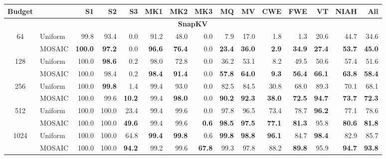 \begin{table}[tp]
  \centering
  \scriptsize
  \setlength{\tabcolsep}{4pt}
  \renewcommand{\arraystretch}{0.92}
  \begin{tabular}{@{} c l rrrrrrrrrrrrr @{}}
    \toprule
    \textbf{Budget} & & \textbf{S1} & \textbf{S2} & \textbf{S3} & \textbf{MK1} & \textbf{MK2} & \textbf{MK3} & \textbf{MQ} & \textbf{MV} & \textbf{CWE} & \textbf{FWE} & \textbf{VT} & \textbf{NIAH} & \textbf{All} \\
    \midrule
    \multicolumn{15}{c}{\textbf{SnapKV}} \\
    \midrule
    \multirow{2}{*}{64} & Uniform & 99.8 & 93.4 & 0.0 & 91.2 & 48.0 & 0.0 & 7.9 & 17.0 & 1.8 & 1.3 & 20.6 & 44.7 & 34.6 \\
     & MOSAIC & \textbf{100.0} & \textbf{97.2} & 0.0 & \textbf{96.6} & \textbf{76.4} & 0.0 & \textbf{23.4} & \textbf{36.0} & \textbf{2.9} & \textbf{34.9} & \textbf{27.4} & \textbf{53.7} & \textbf{45.0} \\
    \cmidrule(l){1-15}
    \multirow{2}{*}{128} & Uniform & 100.0 & \textbf{98.6} & 0.2 & 98.0 & 72.8 & 0.0 & 36.2 & 53.1 & 8.2 & 49.5 & 50.6 & 57.4 & 51.6 \\
     & MOSAIC & 100.0 & 98.4 & 0.2 & \textbf{98.4} & \textbf{91.4} & 0.0 & \textbf{57.8} & \textbf{64.0} & \textbf{9.3} & \textbf{56.4} & \textbf{66.1} & \textbf{63.8} & \textbf{58.4} \\
    \cmidrule(l){1-15}
    \multirow{2}{*}{256} & Uniform & 100.0 & \textbf{99.8} & 1.4 & 99.4 & 93.0 & 0.0 & 82.5 & 84.5 & 30.8 & 68.0 & 89.3 & 70.1 & 68.1 \\
     & MOSAIC & 100.0 & 99.6 & \textbf{10.2} & 99.4 & \textbf{98.0} & 0.0 & \textbf{90.2} & \textbf{92.3} & \textbf{38.0} & \textbf{72.5} & \textbf{94.7} & \textbf{73.7} & \textbf{72.3} \\
    \cmidrule(l){1-15}
    \multirow{2}{*}{512} & Uniform & 100.0 & 100.0 & 23.4 & 99.4 & 99.6 & 0.0 & 97.8 & 96.5 & 73.4 & 78.7 & \textbf{96.2} & 77.1 & 78.6 \\
     & MOSAIC & 100.0 & 100.0 & \textbf{49.6} & 99.4 & 99.6 & \textbf{0.6} & \textbf{98.5} & \textbf{97.5} & \textbf{77.1} & \textbf{81.3} & 95.8 & \textbf{80.6} & \textbf{81.8} \\
    \cmidrule(l){1-15}
    \multirow{2}{*}{1024} & Uniform & 100.0 & 100.0 & 64.8 & \textbf{99.4} & \textbf{99.8} & 0.6 & \textbf{99.8} & \textbf{98.8} & \textbf{96.1} & 84.7 & \textbf{98.4} & 82.9 & 85.7 \\
     & MOSAIC & 100.0 & 100.0 & \textbf{94.2} & 99.2 & 99.6 & \textbf{67.8} & 99.3 & 97.8 & 88.2 & \textbf{89.8} & 95.9 & \textbf{94.7} & \textbf{93.8} \\

\end{tabular}
\end{table}
